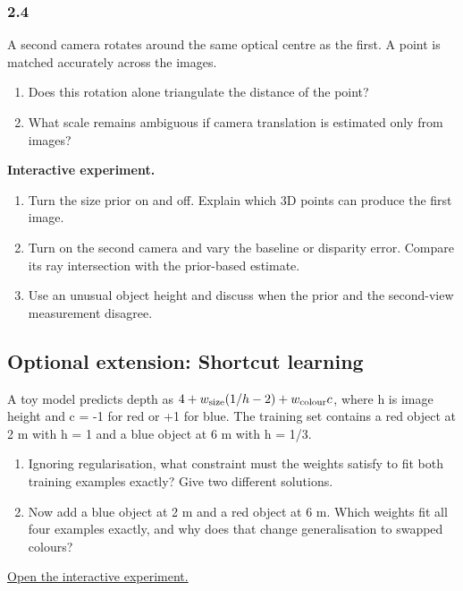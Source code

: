 \documentclass[11pt,a4paper]{article}
\begin{document}
\par\medskip
\par
\noindent
\begin{minipage}{\linewidth}
\subsubsection*{2.4}
A second camera rotates around the same optical centre as the first.
A point is matched accurately across the images.
\begin{enumerate}[label=(\alph*),nosep]
\item Does this rotation alone triangulate the distance of the point?
\item What scale remains ambiguous if camera translation is estimated only from images?
\end{enumerate}
\end{minipage}
\par\medskip
\noindent\textbf{Interactive experiment.}
\begin{enumerate}[nosep]
\item Turn the size prior on and off.
Explain which 3D points can produce the first image.
\item Turn on the second camera and vary the baseline or disparity error.
Compare its ray intersection with the prior-based estimate.
\item Use an unusual object height and discuss when the prior and the second-view measurement disagree.
\end{enumerate}
\par
\noindent
\begin{minipage}{\linewidth}
\subsection*{Optional extension: Shortcut learning}
A toy model predicts depth as $4+w_{\rm size}(1/h-2)+w_{\rm colour}c$, where h is image height and c = -1 for red or +1 for blue.
The training set contains a red object at 2 m with h = 1 and a blue object at 6 m with h = 1/3.
\begin{enumerate}[label=(\alph*),nosep]
\item Ignoring regularisation, what constraint must the weights satisfy to fit both training examples exactly?
Give two different solutions.
\item Now add a blue object at 2 m and a red object at 6 m.
Which weights fit all four examples exactly, and why does that change generalisation to swapped colours?
\end{enumerate}
\end{minipage}
\par\medskip
\noindent\href{https://sosekie.github.io/Unibe-CVG-CV-Interactive-Labs/tutorial-10/#learning}{Open the interactive experiment.}
\end{document}
